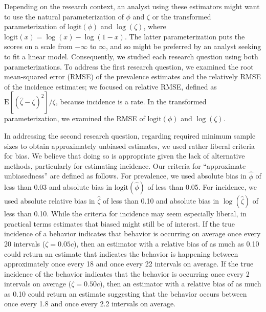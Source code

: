 \documentclass[man, noextraspace, floatsintext]{apa6}\usepackage[]{graphicx}\usepackage[]{color}
\newcommand{\E}{\text{E}}
\newcommand{\logit}{\text{logit}}
\begin{document}
Depending on the research context, an analyst using these estimators might want to use the natural parameterization of $\phi$ and $\zeta$ or the transformed parameterization of $\logit(\phi)$ and $\log(\zeta)$, where $\logit(x) = \log(x) - \log (1 - x)$. 
The latter parameterization puts the scores on a scale from $-\infty$ to $\infty$, and so might be preferred by an analyst seeking to fit a linear model. 
Consequently, we studied each research question using both parameterizations. 
To address the first research question, we examined the root mean-squared error (RMSE) of the prevalence estimates and the relatively RMSE of the incidence estimates; we focused on relative RMSE, defined as $\E\left[\left(\hat\zeta - \zeta\right)^2\right] / \zeta$, because incidence is a rate. 
In the transformed parameterization, we examined the RMSE of $\logit(\phi)$ and $\log(\zeta)$.  

In addressing the second research question, regarding required minimum sample sizes to obtain approximately unbiased estimates, we used rather liberal criteria for bias. 
We believe that doing so is appropriate given the lack of alternative methods, particularly for estimating incidence. 
Our criteria for ``approximate unbiasedness'' are defined as follows. 
For prevalence, we used absolute bias in $\hat\phi$ of less than 0.03 and absolute bias in $\logit(\hat\phi)$ of less than 0.05. 
For incidence, we used absolute relative bias in $\hat\zeta$ of less than 0.10 and absolute bias in $\log(\hat\zeta)$ of less than 0.10. While the criteria for incidence may seem especially liberal, in practical terms estimates that biased might still be of interest. If the true incidence of a behavior indicates that behavior is occurring on average once every 20 intervals ($\zeta = 0.05c$), then an estimator with a relative bias of as much as 0.10 could return an estimate that indicates the behavior is happening between approximately once every 18 and once every 22 intervals on average. If the true incidence of the behavior indicates that the behavior is occurring once every 2 intervals on average ($\zeta = 0.50c$), then an estimator with a relative bias of as much as 0.10 could return an estimate suggesting that the behavior occurs between once every 1.8 and once every 2.2 intervals on average.  
\end{document}
